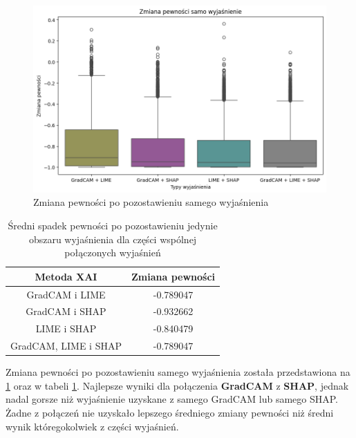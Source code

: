 \begin{figure}[h]
	\centering\includegraphics[width=.9\textwidth]{img/combine_confidence_exp_and}
	\caption{Zmiana pewności po pozostawieniu samego wyjaśnienia}  \label{rys:combineandconfidencean}
\end{figure}
\begin{table}[h]
	\centering
	\begin{tabular}{|c|c|}
		\hline
		\textbf{Metoda XAI}  & Zmiana pewności \\
		\hline
		GradCAM i LIME       & -0.789047       \\
		\hline
		GradCAM i SHAP       & -0.932662       \\
		\hline
		LIME i SHAP          & -0.840479       \\
		\hline
		GradCAM, LIME i SHAP & -0.789047       \\
		\hline
	\end{tabular}
	\caption{Średni spadek pewności po pozostawieniu jedynie obszaru wyjaśnienia dla części wspólnej połączonych wyjaśnień}
	\label{tab:combineandconfidenceand}
\end{table}
Zmiana pewności po pozostawieniu samego wyjaśnienia została przedstawiona na \ref{rys:combineandconfidencean} oraz w tabeli \ref{tab:combineandconfidenceand}.
Najlepsze wyniki dla połączenia \textbf{GradCAM} z \textbf{SHAP}, jednak nadal gorsze niż wyjaśnienie uzyskane z samego GradCAM lub samego SHAP.
Żadne z połączeń nie uzyskało lepszego średniego zmiany pewności niż średni wynik któregokolwiek z części wyjaśnień.

\vspace{1cm}


